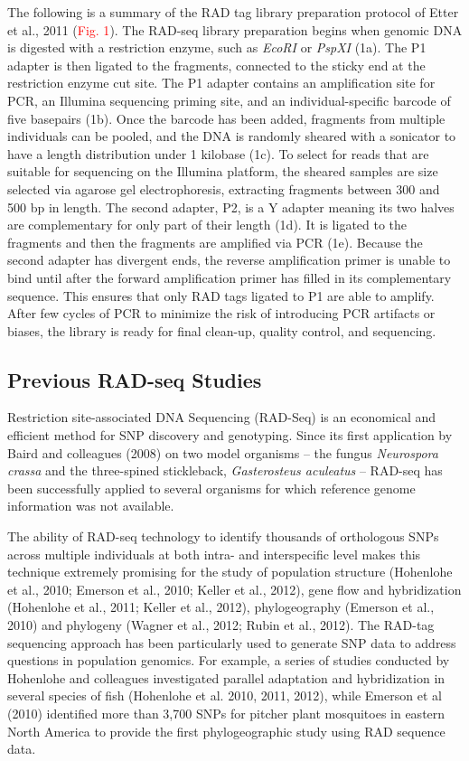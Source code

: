 \documentclass[12pt]{article}
\begin{document}
The following is a summary of the RAD tag library preparation protocol of Etter et al., 2011 (\textcolor{red}{Fig. 1}). The RAD-seq library preparation begins when genomic DNA is digested with a restriction enzyme, such as \emph{EcoRI} or \emph{PspXI} (1a). The P1 adapter is then ligated to the fragments, connected to the sticky end at the restriction enzyme cut site. The P1 adapter contains an amplification site for PCR, an Illumina sequencing priming site, and an individual-specific barcode of five basepairs (1b). Once the barcode has been added, fragments from multiple individuals can be pooled, and the DNA is randomly sheared with a sonicator to have a length distribution under 1 kilobase (1c). To select for reads that are suitable for sequencing on the Illumina platform, the sheared samples are size selected via agarose gel electrophoresis, extracting fragments between 300 and 500 bp in length. The second adapter, P2, is a Y adapter meaning its two halves are complementary for only part of their length (1d). It is ligated to the fragments and then the fragments are amplified via PCR (1e). Because the second adapter has divergent ends, the reverse amplification primer is unable to bind until after the forward amplification primer has filled in its complementary sequence. This ensures that only RAD tags ligated to P1 are able to amplify. After few cycles of PCR to minimize the risk of introducing PCR artifacts or biases, the library is ready for final clean-up, quality control, and sequencing.

\subsection{Previous RAD-seq Studies}

Restriction site-associated DNA Sequencing (RAD-Seq) is an economical and efficient method for SNP discovery and genotyping. Since its first application by Baird and colleagues (2008) on two model organisms – the fungus \emph{Neurospora crassa} and the three-spined stickleback, \emph{Gasterosteus aculeatus} – RAD-seq has been successfully applied to several organisms for which reference genome information was not available. 

The ability of RAD-seq technology to identify thousands of orthologous SNPs across multiple individuals at both intra- and interspecific level makes this technique extremely promising for the study of population structure (Hohenlohe et al., 2010; Emerson et al., 2010; Keller et al., 2012), gene flow and hybridization (Hohenlohe et al., 2011; Keller et al., 2012), phylogeography (Emerson et al., 2010) and phylogeny (Wagner et al., 2012; Rubin et al., 2012). The RAD-tag sequencing approach has been particularly used to generate SNP data to address questions in population genomics. For example, a series of studies conducted by Hohenlohe and colleagues investigated parallel adaptation and hybridization in several species of fish (Hohenlohe et al. 2010, 2011, 2012), while Emerson et al (2010) identified more than 3,700 SNPs for pitcher plant mosquitoes in eastern North America to provide the first phylogeographic study using RAD sequence data. 
\end{document}
